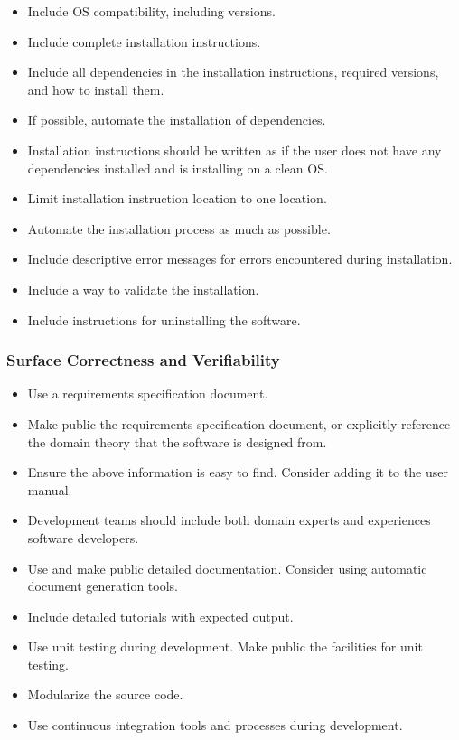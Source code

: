 \documentclass[12pt, notitlepage]{article}
\begin{document}
\begin{itemize}
	\item Include OS compatibility, including versions.
	\item Include complete installation instructions.
	\item Include all dependencies in the installation instructions, required versions, and how to install them.
	\item If possible, automate the installation of dependencies.
	\item Installation instructions should be written as if the user does not have any dependencies installed and is installing on a clean OS.
	\item Limit installation instruction location to one location.
	\item Automate the installation process as much as possible.
	\item Include descriptive error messages for errors encountered during installation.
	\item Include a way to validate the installation.
	\item Include instructions for uninstalling the software.
\end{itemize}

\subsubsection{Surface Correctness and Verifiability}

\begin{itemize}
	\item Use a requirements specification document.
	\item Make public the requirements specification document, or explicitly reference the domain theory that the software is designed from.
	\item Ensure the above information is easy to find. Consider adding it to the user manual. 
	\item Development teams should include both domain experts and experiences software developers.
	\item Use and make public detailed documentation. Consider using automatic document generation tools.
	\item Include detailed tutorials with expected output.
	\item Use unit testing during development. Make public the facilities for unit testing.
	\item Modularize the source code.
	\item Use continuous integration tools and processes during development.
\end{itemize}
\end{document}
